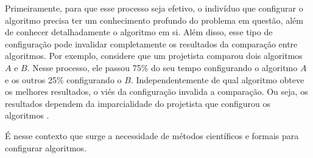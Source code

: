 Primeiramente, para que esse processo seja efetivo, o indivíduo que configurar o algoritmo precisa ter um conhecimento profundo do problema em questão, além de conhecer detalhadamente o algoritmo em si. Além disso, esse tipo de configuração pode invalidar completamente os resultados da comparação entre algoritmos. Por exemplo, considere que um projetista comparou dois algoritmos $A$ e $B$. Nesse processo, ele passou 75\% do seu tempo configurando o algoritmo $A$ e os outros 25\% configurando o $B$. Independentemente de qual algoritmo obteve os melhores resultados, o viés da configuração invalida a comparação. Ou seja, os resultados dependem da imparcialidade do projetista que configurou os algoritmos \citep{birattari2009tuning}.

É nesse contexto que surge a necessidade de métodos científicos e formais para configurar algoritmos. 





